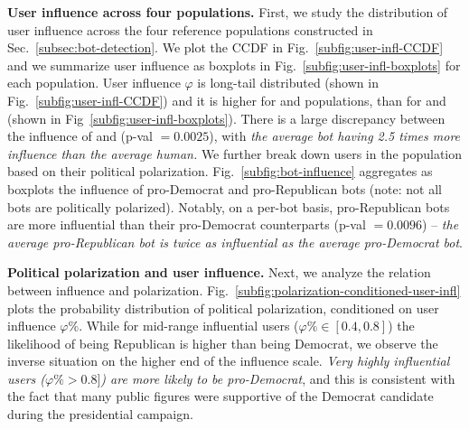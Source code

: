 \textbf{User influence across four populations.}
First, we study the distribution of user influence across the four reference populations constructed in Sec.~\ref{subsec:bot-detection}.
We plot the CCDF in Fig.~\ref{subfig:user-infl-CCDF} and we summarize user influence as boxplots in Fig.~\ref{subfig:user-infl-boxplots} for each population.
User influence $\varphi$ is long-tail distributed (shown in Fig.~\ref{subfig:user-infl-CCDF}) and it is higher for \Bot and \Suspended populations, than for \Human and \Protected (shown in Fig~\ref{subfig:user-infl-boxplots}).
There is a large discrepancy between the influence of \Human and \Bot (p-val $= 0.0025$), with \emph{the average bot having 2.5 times more influence than the average human.}
We further break down users in the \Bot population based on their political polarization.
Fig.~\ref{subfig:bot-influence} aggregates as boxplots the influence of pro-Democrat and pro-Republican bots (note: not all bots are politically polarized).
Notably, on a per-bot basis, pro-Republican bots are more influential than their pro-Democrat counterparts (p-val $= 0.0096$) -- \emph{the average pro-Republican bot is twice as influential as the average pro-Democrat bot}.

\textbf{Political polarization and user influence.}
Next, we analyze the relation between influence and polarization.
Fig.~\ref{subfig:polarization-conditioned-user-infl} plots the probability distribution of political polarization, conditioned on user influence $\varphi \%$.
While for mid-range influential users ($\varphi \% \in [0.4, 0.8]$) the likelihood of being Republican is higher than being Democrat, we observe the inverse situation on the higher end of the influence scale.
\emph{Very highly influential users ($\varphi \% > 0.8]$) are more likely to be pro-Democrat}, and this is consistent with the fact that many public figures were supportive of the Democrat candidate during the presidential campaign.

